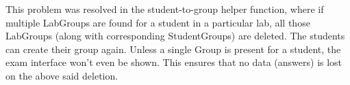 This problem was resolved in the student-to-group helper function, where if multiple LabGroups are found for a student in a particular lab, all those LabGroups (along with corresponding StudentGroups) are deleted. The students can create their group again. Unless a single Group is present for a student, the exam interface won't even be shown. This ensures that no data (answers) is lost on the above said deletion.
